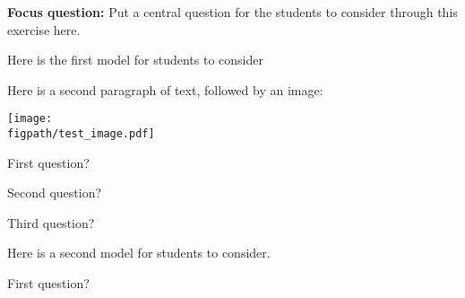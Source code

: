 %
%
%
%

\renewcommand{\figpath}{content}

\begin{activity}

	\textbf{Focus question:} Put a central question for the students to consider through this exercise here.



\begin{model}[ABC]

	Here is the first model for students to consider

	Here is a second paragraph of text, followed by an image:

	\centerline{\texttt{[image: \\figpath/test\_image.pdf]}}

\end{model}


\begin{ctqs}

	\question First question?
	
		\answerspace{1in}
		
	\question Second question?
	
		\answerspace{1in}
		
	\question Third question?
	
		\answerspace{1in}

\end{ctqs}



\begin{model}[DEF]

	Here is a second model for students to consider.

\end{model}

\begin{ctqs}

	\question First question?
	
		\answerspace{1in}		
	

\end{ctqs}
\end{activity}

